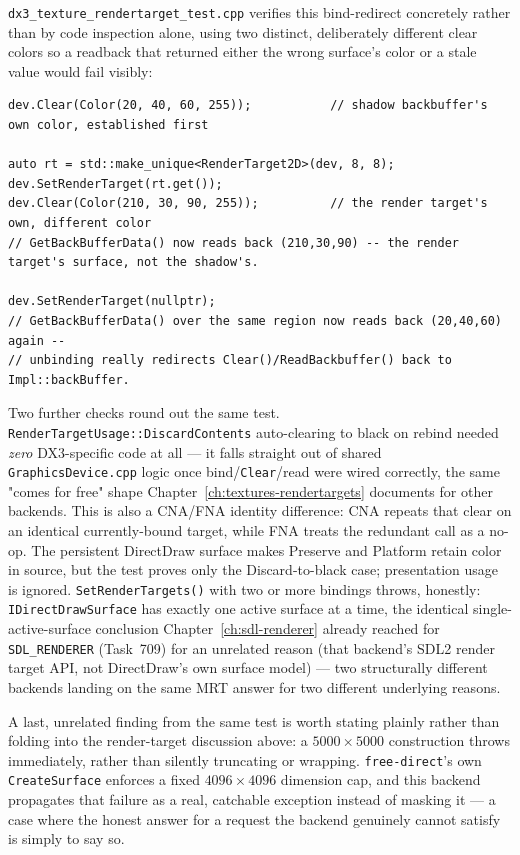 \texttt{dx3\_texture\_rendertarget\_test.cpp} verifies this bind-redirect concretely rather than
by code inspection alone, using two distinct, deliberately different clear colors so a
readback that returned either the wrong surface's color or a stale value would fail visibly:

\begin{lstlisting}
dev.Clear(Color(20, 40, 60, 255));           // shadow backbuffer's own color, established first

auto rt = std::make_unique<RenderTarget2D>(dev, 8, 8);
dev.SetRenderTarget(rt.get());
dev.Clear(Color(210, 30, 90, 255));          // the render target's own, different color
// GetBackBufferData() now reads back (210,30,90) -- the render target's surface, not the shadow's.

dev.SetRenderTarget(nullptr);
// GetBackBufferData() over the same region now reads back (20,40,60) again --
// unbinding really redirects Clear()/ReadBackbuffer() back to Impl::backBuffer.
\end{lstlisting}

Two further checks round out the same test. \texttt{RenderTargetUsage::DiscardContents}
auto-clearing to black on rebind needed \emph{zero} DX3-specific code at all --- it
falls straight out of shared \texttt{GraphicsDevice.cpp} logic once bind/\texttt{Clear}/read
were wired correctly, the same "comes for free" shape Chapter~\ref{ch:textures-rendertargets}
documents for other backends. This is also a CNA/FNA identity difference: CNA repeats that
clear on an identical currently-bound target, while FNA treats the redundant call as a no-op.
The persistent DirectDraw surface makes Preserve and Platform retain color in source, but the
test proves only the Discard-to-black case; presentation usage is ignored.
\texttt{SetRenderTargets()} with two or more bindings throws, honestly:
\texttt{IDirectDrawSurface} has exactly one active surface at a time, the identical
single-active-surface conclusion Chapter~\ref{ch:sdl-renderer} already reached for
\texttt{SDL\_RENDERER} (Task~709) for an unrelated reason (that backend's SDL2 render target
API, not DirectDraw's own surface model) --- two structurally different backends landing on
the same MRT answer for two different underlying reasons.

A last, unrelated finding from the same test is worth stating plainly rather than folding into
the render-target discussion above: a $5000 \times 5000$  construction
throws immediately, rather than silently truncating or wrapping. \texttt{free-direct}'s own
\texttt{CreateSurface} enforces a fixed $4096 \times 4096$ dimension cap, and this backend
propagates that failure as a real, catchable exception instead of masking it --- a case where
the honest answer for a request the backend genuinely cannot satisfy is simply to say so.

